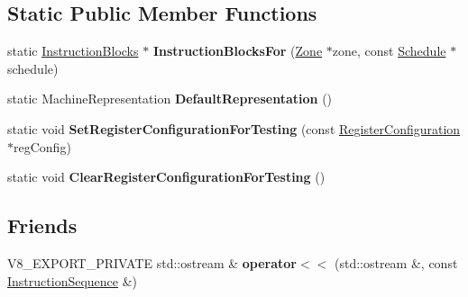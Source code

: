 \subsection*{Static Public Member Functions}
\begin{DoxyCompactItemize}
\item 
\mbox{\label{classv8_1_1internal_1_1compiler_1_1InstructionSequence_a6f677c42a8af001db192a383a038054e}} 
static \mbox{\hyperlink{classv8_1_1internal_1_1ZoneVector}{Instruction\+Blocks}} $\ast$ {\bfseries Instruction\+Blocks\+For} (\mbox{\hyperlink{classv8_1_1internal_1_1Zone}{Zone}} $\ast$zone, const \mbox{\hyperlink{classv8_1_1internal_1_1compiler_1_1Schedule}{Schedule}} $\ast$schedule)
\item 
\mbox{\label{classv8_1_1internal_1_1compiler_1_1InstructionSequence_ac54100a4cfc4148097448cb925d0bbfe}} 
static Machine\+Representation {\bfseries Default\+Representation} ()
\item 
\mbox{\label{classv8_1_1internal_1_1compiler_1_1InstructionSequence_aad5fcb8982b6d10b4163ce03c61ca429}} 
static void {\bfseries Set\+Register\+Configuration\+For\+Testing} (const \mbox{\hyperlink{classv8_1_1internal_1_1RegisterConfiguration}{Register\+Configuration}} $\ast$reg\+Config)
\item 
\mbox{\label{classv8_1_1internal_1_1compiler_1_1InstructionSequence_a0548d4607dbfc2bb52ad4ee9d4dc1bb5}} 
static void {\bfseries Clear\+Register\+Configuration\+For\+Testing} ()
\end{DoxyCompactItemize}
\subsection*{Friends}
\begin{DoxyCompactItemize}
\item 
\mbox{\label{classv8_1_1internal_1_1compiler_1_1InstructionSequence_ab127b5e55b4043ee1e17529c49787e69}} 
V8\+\_\+\+E\+X\+P\+O\+R\+T\+\_\+\+P\+R\+I\+V\+A\+TE std\+::ostream \& {\bfseries operator$<$$<$} (std\+::ostream \&, const \mbox{\hyperlink{classv8_1_1internal_1_1compiler_1_1InstructionSequence}{Instruction\+Sequence}} \&)
\end{DoxyCompactItemize}


